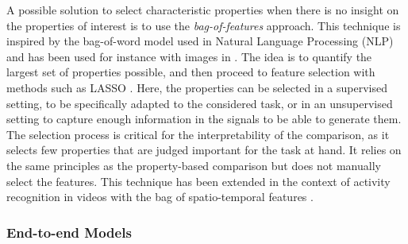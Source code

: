 \documentclass[../thesis.tex]{subfiles}
\begin{document}
{A possible solution to select characteristic properties when there is no insight on the properties of interest is to use the \emph{bag-of-features} approach. This technique is inspired by the bag-of-word model \citep{Harris1954} used in Natural Language Processing (NLP) and has been used for instance with images in \citet{Qiu2002}. The idea is to quantify the largest set of properties possible, and then proceed to feature selection with methods such as LASSO \citep{Tibshirani1996}. Here, the properties can be selected in a supervised setting, to be specifically adapted to the considered task, or in an unsupervised setting to capture enough information in the signals to be able to generate them. The selection process is critical for the interpretability of the comparison, as it selects few properties that are judged important for the task at hand. It relies on the same principles as the property-based comparison but does not manually select the features. This technique has been extended in the context of activity recognition in videos with the bag of spatio-temporal features \citep{Schuldt2004}.

}



\subsubsection{End-to-end Models}
\label{ssub:intro:endtoend}
\end{document}
